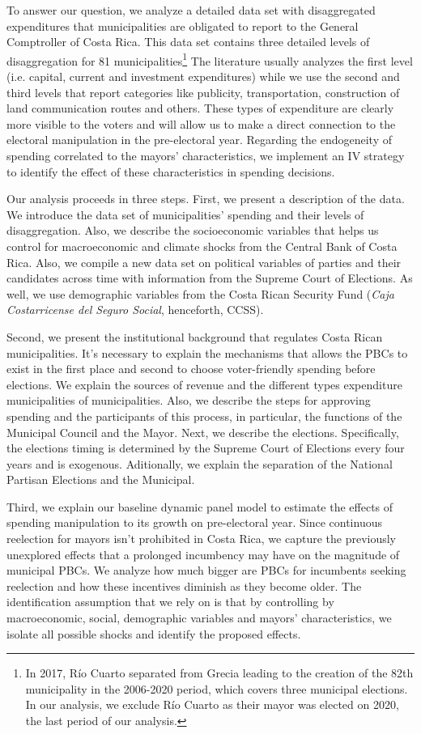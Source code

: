 To answer our question, we analyze a detailed data set with disaggregated expenditures that municipalities are obligated to report to the General Comptroller of Costa Rica. This data set contains three detailed levels of disaggregation for 81 municipalities\footnote{In 2017, Río Cuarto separated from Grecia leading to the creation of the 82th municipality in the 2006-2020 period, which covers three municipal elections. In our analysis, we exclude Río Cuarto as their mayor was elected on 2020, the last period of our analysis. }  The literature usually analyzes the first level (i.e. capital, current and investment expenditures) while we use the second and third levels that report categories like publicity, transportation, construction of land communication routes and others. These types of expenditure are clearly more visible to the voters and will allow us to make a direct connection to the electoral manipulation in the pre-electoral year. Regarding the endogeneity of spending correlated to the mayors' characteristics, we implement an IV strategy to identify the effect of these characteristics in spending decisions. 

Our analysis proceeds in three steps. First, we present a description of the data. We introduce the data set of municipalities' spending and their levels of disaggregation. Also, we describe the socioeconomic variables that helps us control for macroeconomic and climate shocks from the Central Bank of Costa Rica. Also, we compile a new data set on political variables of parties and their candidates across time with information from the Supreme Court of Elections. As well, we use demographic variables from the Costa Rican Security Fund (\textit{Caja Costarricense del Seguro Social}, henceforth, CCSS). 

Second, we present the institutional background that regulates Costa Rican municipalities. It's necessary to explain the mechanisms that allows the PBCs to exist in the first place and second to choose voter-friendly spending before elections. We explain the sources of revenue and the different types expenditure municipalities of municipalities. Also, we describe the steps for approving spending and the participants of this process, in particular, the functions of the Municipal Council and the Mayor. Next, we describe the elections. Specifically, the elections timing is determined by the Supreme Court of Elections every four years and is exogenous. Aditionally, we explain the separation of the National Partisan Elections and the Municipal.  

Third, we explain our baseline dynamic panel model to estimate the effects of spending manipulation to its growth on pre-electoral year. Since continuous reelection for mayors isn't prohibited in Costa Rica, we capture the previously unexplored effects that a prolonged incumbency may have on the magnitude of municipal PBCs. We analyze how much bigger are PBCs for incumbents seeking reelection and how these incentives diminish as they become older. The identification assumption that we rely on is that by controlling by macroeconomic, social, demographic variables and mayors' characteristics, we isolate all possible shocks and identify the proposed effects. 
